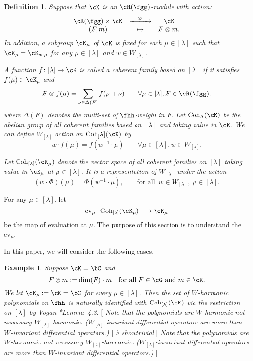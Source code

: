 \documentclass[12pt,a4paper]{amsart}
\newcommand{\trivial}[2][]{\if\relax\detokenize{#1}\relax
  {%
      \color{orange} \vspace{0em} $[$  #2 $]$
      \color{black}
  }
  \else
\ifx#1h
\ifcsname showtrivial\endcsname
{%
    \color{orange} \vspace{0em}  $[$ #2 $]$
    \color{black}
}
\fi
\else {\red Wrong argument!} \fi
\fi
}
\numberwithin{equation}{section}
\newtheorem{defn}[thm]{Definition}
\newtheorem{eg}[thm]{Example}
\theoremstyle{remark}
\def\WT#1{\Delta(#1)}
\def\WLam{W_{\Lam}}
\def\Coh{\mathrm{Coh}}
\def\ev#1{{\mathrm{ev}_{#1}}}
\newcommand{\Lam}{{[\lambda]}}
\newcommand{\Rg}{\cR(\fgg)}
\begin{document}
\begin{defn}
  Suppose that $\cK$ is an $\Rg$-module with action:
  \[
    \begin{array}{ccc}
      \Rg \times \cK & \xrightarrow{\ \ \ \otimes \ \ \ } & \cK\\
      (F,m) & \mapsto & F\otimes m.
    \end{array}
  \]
  In addition, a subgroup $\cK_{\mu}$ of $\cK$ is fixed for each $\mu \in \Lam$
  such that $\cK_{\mu} = \cK_{w\cdot \mu}$ for any $\mu\in [\lambda]$ and
  $w\in \WLam$.

  A function $f\colon \Lam \rightarrow \cK$ is called a coherent family based on
  $\Lam$ if it satisfies $f(\mu)\in \cK_\mu$ and
  \[
    F\otimes f(\mu) = \sum_{\nu \in \WT{F}} f(\mu+\nu) \qquad \forall \mu\in \Lam, F\in \Rg.
  \]
  where $\WT{F}$ denotes the multi-set of $\fhh$-weight in $F$. Let
  $\Coh_{\Lambda}(\cK)$ be the abelian group of all coherent families based on
  $\Lam$ and taking value in $\cK$. We can define $\WLam$ action on
  $\Coh_[\lambda](\cK)$ by
  \[
    w\cdot f(\mu) = f(w^{-1}\cdot \mu) \qquad \forall \mu\in \Lam, w\in \WLam.
  \]


  Let $\Coh_{\Lam}(\cK_{\mu})$ denote the vector space of all coherent families
  on $\Lam$ taking value in $\cK_{\mu}$ at $\mu\in \Lam$. It is a representation
  of $\WLam$ under the action
  \[
    (w\cdot \Phi)(\mu) = \Phi(w^{-1}\cdot \mu), \qquad \textrm{for all
    }\ w\in W_\Lam, \ \mu\in \Lam.
  \]
\end{defn}
For any $\mu\in \Lam$, let
\[
  \ev{\mu}\colon \Coh_{\Lam}(\cK_{\mu}) \longrightarrow \cK_{\mu}
\]
be the map of evaluation at $\mu$. The purpose of this section is to understand
the $\ev{\mu}$.

In this paper, we will consider the following cases.
\begin{eg}
  Suppose $\cK=\bC$ and
  \[
    F\otimes m := \dim(F)\cdot m \quad \text{for all } F\in \cG \text{ and
    } m\in \cK.
  \]
  We let $\cK_{\mu} := \cK = \bC$ for every $\mu\in \Lam$. Then the set of
  $W$-harmonic polynomials on $\fhh$ is naturally identified with
  $\Coh_{\Lam}(\cK)$ via the restriction on $[\lambda]$ by Vogan
  \cite{VGK}*{Lemma~4.3}. \trivial{ Note that the polynomials are $W$-harmonic
    not necessary $W_{[\lambda]}$-harmonic. ($W_{[\lambda]}$-invariant
    differential operators are more than $W$-invariant differential operators.)
  }
\end{eg}
\end{document}
